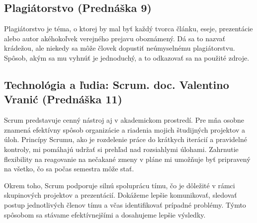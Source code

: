 \documentclass[12pt,twoside,slovak,a4paper]{article}
\begin{document}
\subsection{Plagiátorstvo (Prednáška 9)}
Plagiátorstvo je téma, o ktorej by mal byť každý tvorca článku, eseje, prezentácie alebo autor akéhokoľvek verejného prejavu oboznámený. Dá sa to nazvať krádežou, ale niekedy sa môže človek dopustiť neúmyselnému plagiátorstvu. Spôsob, akým sa mu vyhnúť je jednoduchý, a to odkazovať sa na použité zdroje.

\subsection{Technológia a ľudia: Scrum. doc. Valentino Vranić (Prednáška 11)}
Scrum predstavuje cenný nástroj aj v akademickom prostredí. Pre mňa osobne znamená efektívny spôsob organizácie a riadenia mojich študijných projektov a úloh. Princípy Scrumu, ako je rozdelenie práce do krátkych iterácií a pravidelné kontroly, mi pomáhajú udržať si prehľad nad rozsiahlymi úlohami. Zahrnutie flexibility na reagovanie na nečakané zmeny v pláne mi umožňuje byť pripravený na všetko, čo sa počas semestra môže stať.

Okrem toho, Scrum podporuje silnú spoluprácu tímu, čo je dôležité v rámci skupinových projektov a prezentácií. Dokážeme lepšie komunikovať, sledovať postup jednotlivých členov tímu a včas identifikovať prípadné problémy. Týmto spôsobom sa stávame efektívnejšími a dosahujeme lepšie výsledky.




%
%
%





\nocite{10057722}
\nocite{7087040}
\nocite{7783248}
\nocite{7809906}
\nocite{8250692}
\nocite{8575882}
\nocite{9325452}
\nocite{9719080}
\nocite{9952138}
\nocite{9952143}
\nocite{1250902}
\nocite{6616536}




\end{document}
